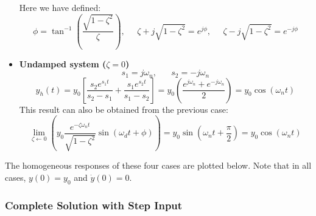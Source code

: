 \documentclass{article}
\begin{document}
\begin{itemize}
  Here we have defined:
  \begin{equation} 
    \phi=\tan^{-1}\left( \frac{\sqrt{1-\zeta^2}}{\zeta} \right),\;\;\;\;\;
    \zeta+j\sqrt{1-\zeta^2}=e^{j\phi},\;\;\;\;\;\zeta-j\sqrt{1-\zeta^2}=e^{-j\phi}
  \end{equation}
\item {\bf Undamped system ($ \zeta =0$)}
  \begin{equation}
    s_1=j\omega_n,\;\;\;\;\;\;s_2=-j\omega_n 
  \end{equation}
  \begin{equation}
    y_h(t)=y_0 \left[ \frac{s_2 e^{s_1t}}{s_2-s_1}+\frac{s_1 e^{s_2t}}{s_1-s_2} \right]
    =y_0\left(\frac{e^{j\omega_n}+e^{-j\omega_n}}{2}\right)=y_0\cos(\omega_nt) 
  \end{equation}
  This result can also be obtained from the previous case:
  \begin{equation}
    \lim_{\zeta\leftarrow 0} \left(y_0\frac{e^{-\zeta\omega_nt}}{\sqrt{1-\zeta^2}} \sin(\omega_dt+\phi) \right)
    =y_0\sin(\omega_nt+\frac{\pi}{2})=y_0\cos(\omega_nt) 
  \end{equation}
\end{itemize}

The homogeneous responses of these four cases are plotted below. Note that in all cases,
$y(0)=y_0$ and $\dot{y}(0)=0$.




\subsubsection*{Complete Solution with Step Input}
\end{document}
